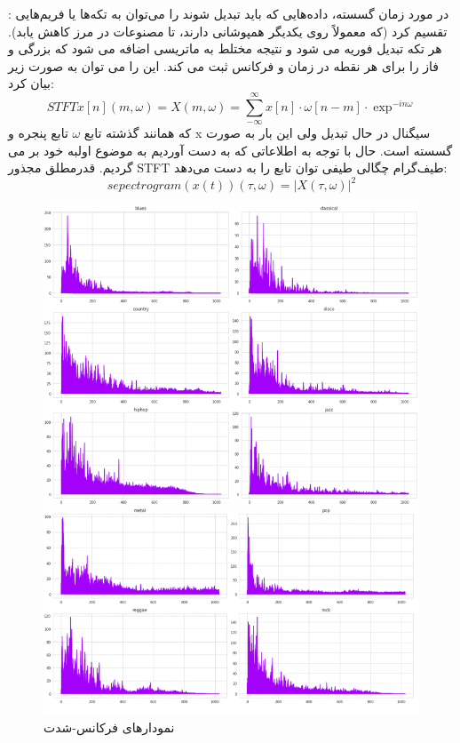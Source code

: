 \documentclass{article}
\begin{document}
:\newline
در مورد زمان گسسته، داده‌هایی که باید تبدیل شوند را می‌توان به تکه‌ها یا فریم‌هایی تقسیم کرد (که معمولاً روی یکدیگر همپوشانی دارند، تا مصنوعات در مرز کاهش یابد). هر تکه تبدیل فوریه می شود و نتیجه مختلط به ماتریسی اضافه می شود که بزرگی و فاز را برای هر نقطه در زمان و فرکانس ثبت می کند. این را می توان به صورت زیر بیان کرد:
\begin{equation}
		STFT{x[n]}(m , \omega)=X(m , \omega)=\sum_{-\infty}^{\infty} x[n]\cdot \omega[n-m]\cdot \exp^{-in\omega}
\end{equation}
که همانند گذشته تابع $\omega$ تابع پنجره و x سیگنال در حال تبدیل ولی این بار به صورت گسسته است.\newline
حال با توجه به اطلاعاتی که به دست آوردیم به موضوع اولبه خود بر می گردیم.\newline
قدرمطلق مجذور STFT طیف‌گرام چگالی طیفی توان تابع را به دست می‌دهد:
\begin{equation}
	sepectrogram(x(t))(\tau , \omega)=|X(\tau,\omega)|^{2}
\end{equation}
\begin{figure}[h]
	\centering
	\includegraphics[width=0.5\linewidth]{Photo/5}
	\caption[نمودارهای فرکانس-شدت]{نمودارهای فرکانس-شدت}
	\label{fig:5}
\end{figure}
\end{document}
